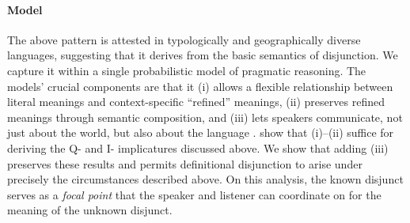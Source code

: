 \documentclass[12pt]{article}
\newcommand{\tech}[1]{\emph{#1}}
\begin{document}
\paragraph{Model} The above pattern is attested in typologically and
geographically diverse languages, suggesting that it derives from the
basic semantics of disjunction. We capture it within a single
probabilistic model of pragmatic reasoning. The models' crucial
components are that it (i) allows a flexible relationship between
literal meanings and context-specific ``refined'' meanings, (ii)
preserves refined meanings through semantic composition, and (iii)
lets speakers communicate, not just about the world, but also about
the language
\citep{Smith:Goodman:Frank:2013}. \citet{Bergen:Goodman:Levy:2012}
show that (i)--(ii) suffice for deriving the Q- and I- implicatures
discussed above. We show that adding (iii) preserves these results and
permits definitional disjunction to arise under precisely the
circumstances described above. On this analysis, the known disjunct
serves as a \tech{focal point} that the speaker and listener can
coordinate on for the meaning of the unknown disjunct.


\let\olditem\item
\renewenvironment{thebibliography}[1]{\footnotesize
  \paragraph{References}
  \let\par\relax\let\newblock\relax
  \renewcommand{\item}[1][]{\olditem[\textbullet]}%
  \inparaenum}{\endinparaenum}



\end{document}
